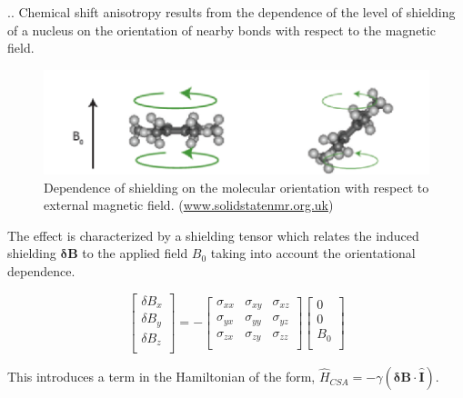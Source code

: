 \documentclass{beamer}
\begin{document}
\begin{frame}{\thesection.\thesubsection. \insertsubsection}
	Chemical shift anisotropy results from the dependence of the level of shielding of a nucleus on the orientation of nearby bonds with respect to the magnetic field.
	
	\begin{figure}
		\centering
		\includegraphics[scale=0.1]{CSA1.png}
		\caption{Dependence of shielding on the molecular orientation with respect to external magnetic field. (\url{www.solidstatenmr.org.uk})}
	\end{figure}	
	
	The effect is characterized by a shielding tensor which relates the induced shielding $\bm{\delta B}$ to the applied field $B_0$ taking into account the orientational dependence.
	
	\begin{equation}
       \begin{bmatrix}
          \delta B_x \\
          \delta B_y \\
          \delta B_z \\
       \end{bmatrix} = -
       \begin{bmatrix}
       \sigma_{xx} & \sigma_{xy} & \sigma_{xz} \\
       \sigma_{yx} & \sigma_{yy} & \sigma_{yz} \\
       \sigma_{zx} & \sigma_{zy} & \sigma_{zz} \\
       \end{bmatrix} 
       \begin{bmatrix}
       0 \\ 
       0 \\
       B_0 \\
       \end{bmatrix}        
	\end{equation}
	
	This introduces a term in the Hamiltonian of the form, $\hat{H}_{CSA} = - \gamma (\bm{\delta B} \cdot \bm{\hat{I}})$.
	
	
\end{frame}
\end{document}

